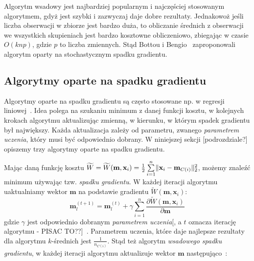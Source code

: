 \documentclass{praca1}
\DeclarePairedDelimiter{\norm}{\lVert}{\rVert}
\begin{document}
Algorytm wsadowy jest najbardziej popularnym i najczęściej stosowanym algorytmem, gdyż jest szybki i zazwyczaj daje dobre rezultaty. Jednakowoż jeśli liczba obserwacji w zbiorze jest bardzo duża, to obliczanie średnich z obserwacji we wszystkich skupieniach jest bardzo kosztowne obliczeniowo, zbiegając w czasie $O(knp)$, gdzie $p$ to liczba zmiennych. Stąd Bottou i Bengio~\cite{Bottou1995:convergenceproperties} zaproponowali algorytm oparty na stochastycznym spadku gradientu.

\subsection{Algorytmy oparte na spadku gradientu}

Algorytmy oparte na spadku gradientu są często stosowane np. w regresji liniowej~\cite{Bottou2012:sgdtricks}. Idea polega na szukaniu minimum z danej funkcji kosztu, w kolejnych krokach algorytmu aktualizując zmienną, w kierunku, w którym spadek gradientu był największy. Każda aktualizacja zależy od parametru, zwanego \emph{parametrem uczenia}, który musi być odpowiednio dobrany. W niniejszej sekcji [podrozdziale?] opiszemy trzy algorytmy oparte na spadku gradientu.


Mając daną funkcję kosztu $\widetilde{W} = \widetilde{W}(\mathbf{m}, \mathbf{x}_i) = \frac{1}{2}\sum\limits_{i=1}^{n} \norm{\mathbf{x}_i - \mathbf{m}_{C(i)}}_2^2 $, możemy znaleźć minimum używając tzw. \emph{spadku gradientu}. W każdej iteracji algorytmu uaktualniamy wektor $\mathbf{m}$ na podstawie gradientu $\widetilde{W}(\mathbf{m}, \mathbf{x}_i)$:
\begin{equation}
\mathbf{m}^{(t+1)}_l = \mathbf{m}_l^{(t)} + \gamma \sum\limits_{i=1}^{n} \frac{\partial \widetilde{W}(\mathbf{m}, \mathbf{x}_i)}{\partial \mathbf{m}}
\end{equation}
gdzie $\gamma$ jest odpowiednio dobranym \emph{parametrem uczenia}[, a $t$ oznacza iterację algorytmu - PISAC TO??]~\cite{Bottou2012:sgdtricks}. Parametrem uczenia, które daje najlepsze rezultaty dla algorytmu $k$-średnich jest $\frac{1}{n_{C(i)}}$. Stąd też algorytm \emph{wsadowego spadku gradientu}, w każdej iteracji algorytmu aktualizuje wektor $\mathbf{m}$ następująco~\cite{Bottou1995:convergenceproperties}:

\end{document}
